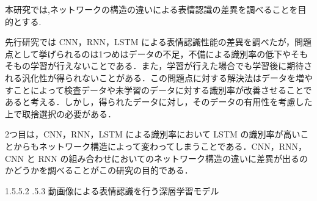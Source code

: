 \documentclass[a4paper,10pt]{jarticle}
\makeatletter
\renewcommand{\section}{\@startsection{section}{1}{\z@}%
   {1.5\Cvs \@plus.5\Cvs \@minus.2\Cvs}%
   {.5\Cvs \@plus.3\Cvs}%
   {\reset@font\large\bfseries}}   %
\makeatother
\begin{document}

本研究では,ネットワークの構造の違いによる表情認識の差異を調べることを目的とする.

先行研究では CNN，RNN，LSTM による表情認識性能の差異を調べたが，問題点として挙げられるのは1つめはデータの不足，不備による識別率の低下やそもそもの学習が行えないことである．また，学習が行えた場合でも学習後に期待される汎化性が得られないことがある．この問題点に対する解決法はデータを増やすことによって検査データや未学習のデータに対する識別率が改善させることであると考える．しかし，得られたデータに対し，そのデータの有用性を考慮した上で取捨選択の必要がある．

2つ目は，CNN，RNN，LSTM による識別率において LSTM の識別率が高いことからもネットワーク構造によって変わってしまうことである．CNN，RNN，CNN と RNN の組み合わせにおいてのネットワーク構造の違いに差異が出るのかどうかを調べることがこの研究の目的である．

\section{動画像による表情認識を行う深層学習モデル}
\end{document}
